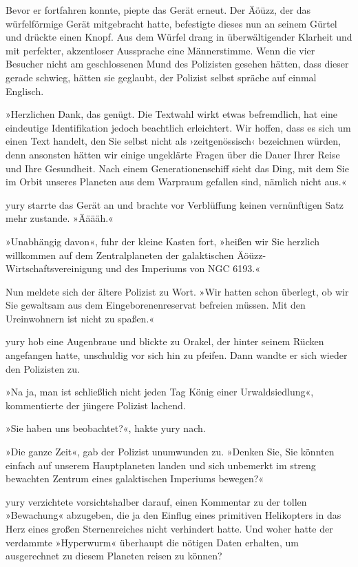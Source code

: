 Bevor er fortfahren konnte, piepte das Gerät erneut. Der Äöüzz, der das würfelförmige Gerät mitgebracht hatte, befestigte dieses nun an seinem Gürtel und drückte einen Knopf. Aus dem Würfel drang in überwältigender Klarheit und mit perfekter, akzentloser Aussprache eine Männerstimme. Wenn die vier Besucher nicht am geschlossenen Mund des Polizisten gesehen hätten, dass dieser gerade schwieg, hätten sie geglaubt, der Polizist selbst spräche auf einmal Englisch.

»Herzlichen Dank, das genügt. Die Textwahl wirkt etwas befremdlich, hat eine eindeutige Identifikation jedoch beachtlich erleichtert. Wir hoffen, dass es sich um einen Text handelt, den Sie selbst nicht als ›zeitgenössisch‹ bezeichnen würden, denn ansonsten hätten wir einige ungeklärte Fragen über die Dauer Ihrer Reise und Ihre Gesundheit. Nach einem Generationenschiff sieht das Ding, mit dem Sie im Orbit unseres Planeten aus dem Warpraum gefallen sind, nämlich nicht aus.«

yury starrte das Gerät an und brachte vor Verblüffung keinen vernünftigen Satz mehr zustande. »Ääääh.«

»Unabhängig davon«, fuhr der kleine Kasten fort, »heißen wir Sie herzlich willkommen auf dem Zentralplaneten der galaktischen Äöüzz-Wirtschaftsvereinigung und des Imperiums von NGC 6193.«

Nun meldete sich der ältere Polizist zu Wort. »Wir hatten schon überlegt, ob wir Sie gewaltsam aus dem Eingeborenenreservat befreien müssen. Mit den Ureinwohnern ist nicht zu spaßen.«

yury hob eine Augenbraue und blickte zu Orakel, der hinter seinem Rücken angefangen hatte, unschuldig vor sich hin zu pfeifen. Dann wandte er sich wieder den Polizisten zu.

»Na ja, man ist schließlich nicht jeden Tag König einer Urwaldsiedlung«, kommentierte der jüngere Polizist lachend.

»Sie haben uns beobachtet?«, hakte yury nach.

»Die ganze Zeit«, gab der Polizist unumwunden zu. »Denken Sie, Sie könnten einfach auf unserem Hauptplaneten landen und sich unbemerkt im streng bewachten Zentrum eines galaktischen Imperiums bewegen?«

yury verzichtete vorsichtshalber darauf, einen Kommentar zu der tollen »Bewachung« abzugeben, die ja den Einflug eines primitiven Helikopters in das Herz eines großen Sternenreiches nicht verhindert hatte. Und woher hatte der verdammte »Hyperwurm« überhaupt die nötigen Daten erhalten, um ausgerechnet zu diesem Planeten reisen zu können?

